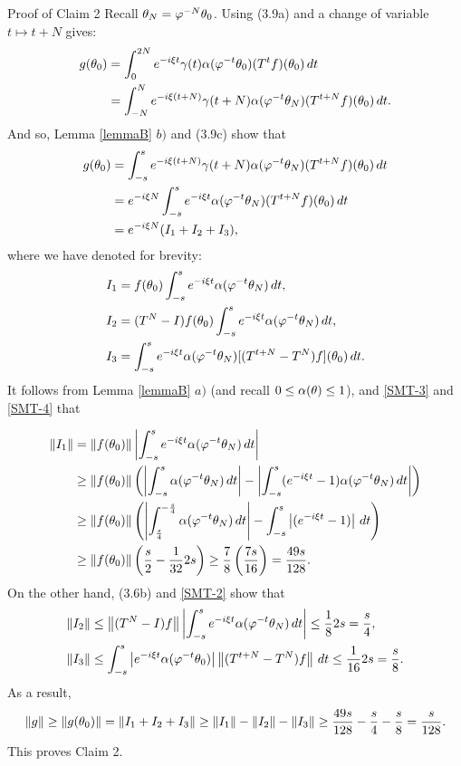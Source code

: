 \begin{pf}
\begin{pf*}{Proof of Claim 2} Recall $\theta_N=\varphi^{-N}\theta_0$.
Using (3.9a) and a change of variable $t\mapsto t+N$ gives:
$$\begin{aligned}
g(\theta_0) &= \int^{2N}_0  e^{-i\xi t} \gamma(t)
          \alpha(\varphi^{-t}\theta_0)(T^tf)(\theta_0)\,dt\\
&=\int^N_{-N}
e^{-i\xi(t+N)}\gamma(t+N)\alpha(\varphi^{-t}\theta_N)(T^{t+N}f) (\theta_0)\,dt.
\end{aligned}$$
And so, Lemma \ref{lemmaB} $b)$ and (3.9c) show that
$$\begin{aligned}
g(\theta_0) &= \int^s_{-s}e^{-i\xi(t+N)}\gamma(t+N)
   \alpha(\varphi^{-t}\theta_N)(T^{t+N}f)(\theta_0)\,dt\\
&=e^{-i\xi N} \int^s_{-s}
e^{-i\xi t}\alpha(\varphi^{-t}\theta_N)(T^{t+N}f)(\theta_0)\,dt\\
&= e^{-i\xi N}(I_1 +
I_2 + I_3), \end{aligned}$$
where we have denoted for brevity:
$$\begin{aligned}
I_1 &=f(\theta_0)\int^s_{-s} e^{-i\xi t}\alpha(\varphi^{-t}\theta_N)\,dt,\\
I_2&=(T^N-I)f(\theta_0)\int^s_{-s}e^{-i\xi t}
    \alpha(\varphi^{-t}\theta_N)\,dt,\\
I_3 &=\int^s_{-s}e^{-i\xi t}\alpha(\varphi^{-t}\theta_N)
    [(T^{t+N}-T^N)f](\theta_0)\,dt.
\end{aligned}$$
It follows from Lemma \ref{lemmaB} $a)$
(and recall $0\le\alpha(\theta)\le 1$), and \eqref{SMT-3} and \eqref{SMT-4}
that

$$\begin{aligned}
\|I_1\| &= \|f(\theta_0)\|\left|\int^s_{-s}
        e^{-i\xi t}\alpha(\varphi^{-t}\theta_N)\,dt\right| \\
&\ge\|f(\theta_0)\|\left(\left|\int^s_{-s}\alpha(\varphi^{-t}\theta_N)\,dt\right|
     -\left|\int^s_{-s}(e^{-i\xi t}-1)\alpha(\varphi^{-t}\theta_N)\,dt
     \right|\right) \\
&\ge \|f(\theta_0)\|\left(\left|\int^{-\frac{s}{4}}_{\frac{s}{4}}
     \alpha(\varphi^{-t}\theta_N)\,dt\right|
     -\int^s_{-s}\left|(e^{-i\xi t}-1)\right|\,dt \right) \\
&\ge \|f(\theta_0)\|\left( \frac{s}{2}-\frac{1}{32}2s\right)
\ge \frac{7}{8}\left(\frac{7s}{16}\right)=\frac{49s}{128}.
\end{aligned}$$
On the other hand, (3.6b) and \eqref{SMT-2} show that
$$\begin{aligned}
\|I_2\| &\le \left\|(T^N-I)f\right\| \left|\int^s_{-s}
   e^{-i\xi t}\alpha(\varphi^{-t}\theta_N)\,dt\right|
    \le \frac{1}{8}2s = \dfrac{s}{4}, \\
\|I_3\| &\le \int^s_{-s}
\left|e^{-i\xi t}\alpha(\varphi^{-t}\theta_0)\right|
  \left\|(T^{t+N}-T^N)f\right\|\,dt
  \le \dfrac{1}{16}2s = \dfrac{s}{8}.
\end{aligned}$$
As a result,
\[ \|g\| \ge \|g(\theta_0)\|=
  \|I_1+I_2+I_3\|\ge \|I_1\|-\|I_2\|-\|I_3\| \ge
  \dfrac{49s}{128}-\dfrac{s}{4}-\dfrac{s}{8}=\dfrac{s}{128}.\]
This proves Claim 2.
\end{pf*}


\end{pf}
